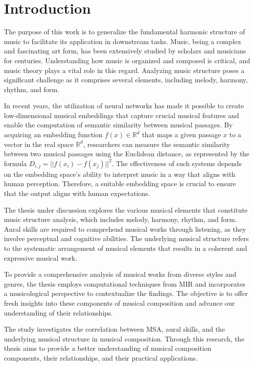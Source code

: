 \chapter{Introduction}

The purpose of this work is to generalize the fundamental harmonic structure of music to facilitate its application in downstream tasks. Music, being a complex and fascinating art form, has been extensively studied by scholars and musicians for centuries. Understanding how music is organized and composed is critical, and music theory plays a vital role in this regard. Analyzing music structure poses a significant challenge as it comprises several elements, including melody, harmony, rhythm, and form.

In recent years, the utilization of neural networks has made it possible to create low-dimensional musical embeddings that capture crucial musical features and enable the computation of semantic similarity between musical passages. By acquiring an embedding function $f(x) \in \mathbb{R}^d$ that maps a given passage $x$ to a vector in the real space $\mathbb{R}^d$, researchers can measure the semantic similarity between two musical passages using the Euclidean distance, as represented by the formula $D_{i,j} = ||f(x_i) - f(x_j)||^2$. The effectiveness of such systems depends on the embedding space's ability to interpret music in a way that aligns with human perception. Therefore, a suitable embedding space is crucial to ensure that the output aligns with human expectations.

The thesis under discussion explores the various musical elements that constitute music structure analysis, which includes melody, harmony, rhythm, and form. Aural skills are required to comprehend musical works through listening, as they involve perceptual and cognitive abilities. The underlying musical structure refers to the systematic arrangement of musical elements that results in a coherent and expressive musical work.

To provide a comprehensive analysis of musical works from diverse styles and genres, the thesis employs computational techniques from MIR and incorporates a musicological perspective to contextualize the findings. The objective is to offer fresh insights into these components of musical composition and advance our understanding of their relationships.

The study investigates the correlation between MSA, aural skills, and the underlying musical structure in musical composition. Through this research, the thesis aims to provide a better understanding of musical composition components, their relationships, and their practical applications. 
